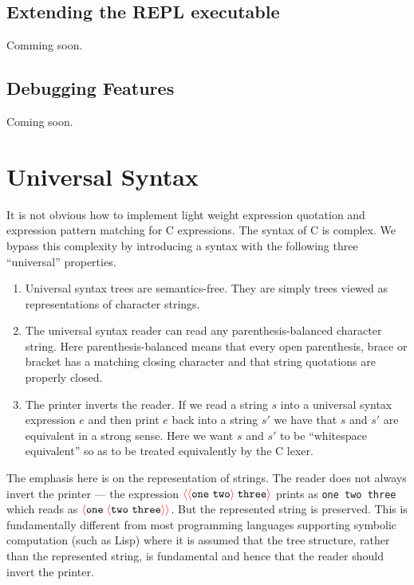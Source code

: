 \documentclass{article}
\newcommand{\fopen}{{\color{red} \langle}}
\newcommand{\fclose}{{\color{red} \rangle}}
\begin{document}
\subsection{Extending the REPL executable}
\label{sec:exntensions}

Comming soon.

\subsection{Debugging Features}
\label{sec:debugging}

Coming soon.

\section{Universal Syntax}

It is not obvious how to implement light weight expression quotation and expression pattern matching for C expressions.  The syntax of C is complex.
We bypass this complexity by introducing a syntax with the following three ``universal'' properties.

\begin{enumerate}
\item Universal syntax trees are semantics-free.  They are simply trees viewed as representations of character strings.

\item The universal syntax reader can read any parenthesis-balanced character string.
  Here parenthesis-balanced means that every open parenthesis, brace or bracket has a matching closing character and that string quotations
  are properly closed.
  
\item The printer inverts the reader. If we read a string $s$ into a universal syntax expression
  $e$ and then print $e$ back into a string $s'$ we have that $s$ and $s'$ are equivalent in a strong sense.  Here we want
  $s$ and $s'$ to be ``whitespace equivalent'' so as to be treated equivalently by the C lexer.
\end{enumerate}

The emphasis here is on the representation of strings.  The reader does not always invert the printer ---
the expression $\fopen \fopen \mathtt{one~two} \fclose \;\mathtt{three}\fclose$ prints as {\tt one two three} which reads as
$\fopen \mathtt{one}\; \fopen \mathtt{two~three} \fclose \fclose$.  But the represented string is preserved.  This is fundamentally different from
most programming languages supporting symbolic computation (such as Lisp) where it is assumed that the tree structure, rather than the represented string, is fundamental
and hence that the reader should invert the printer.
\end{document}
